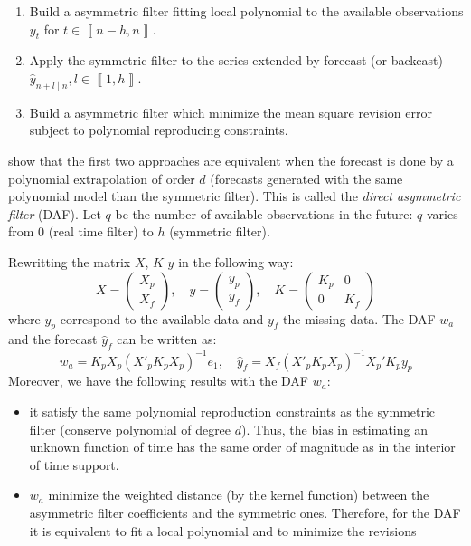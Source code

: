 \documentclass[
  12pt,
  ,
  a4paper]{article}
\newcommand\1{\mathds{1}}
\begin{document}
\begin{enumerate}
\def\labelenumi{\arabic{enumi}.}
\item
  Build a asymmetric filter fitting local polynomial to the available observations \(y_{t}\) for \(t\in\left\llbracket n-h,n\right\rrbracket\).
\item
  Apply the symmetric filter to the series extended by forecast (or backcast) \(\hat{y}_{n+l\mid n},l\in\left\llbracket 1,h\right\rrbracket\).
\item
  Build a asymmetric filter which minimize the mean square revision error subject to polynomial reproducing constraints.
\end{enumerate}

\textcite{proietti2008} show that the first two approaches are equivalent when the forecast is done by a polynomial extrapolation of order \(d\) (forecasts generated with the same polynomial model than the symmetric filter). This is called the \emph{direct asymmetric filter} (DAF).
Let \(q\) be the number of available observations in the future: \(q\) varies from 0 (real time filter) to \(h\) (symmetric filter).

Rewritting the matrix \(X\), \(K\) \(y\) in the following way:
\[
X=\begin{pmatrix}X_{p}\\
X_{f}
\end{pmatrix},\quad y=\begin{pmatrix}y_{p}\\
y_{f}
\end{pmatrix},\quad K=\begin{pmatrix}K_{p} & 0\\
0 & K_{f}
\end{pmatrix}
\]
where \(y_{p}\) correspond to the available data and \(y_{f}\) the missing data. The DAF \(w_a\) and the forecast \(\hat{y}_{f}\) can be written as:
\[
w_{a}=K_{p}X_{p}(X'_{p}K_{p}X_{p})^{-1}e_{1},
\quad
\hat{y}_{f}=X_{f}(X'_{p}K_{p}X_{p})^{-1}X_{p}'K_{p}y_{p}
\]
Moreover, we have the following results with the DAF \(w_a\):

\begin{itemize}
\item
  it satisfy the same polynomial reproduction constraints as the symmetric filter (conserve polynomial of degree \(d\)).
  Thus, the bias in estimating an unknown function of time has the same order of magnitude as in the interior of time support.
\item
  \(w_a\) minimize the weighted distance (by the kernel function) between the asymmetric filter coefficients and the symmetric ones.
  Therefore, for the DAF it is equivalent to fit a local polynomial and to minimize the revisions
\end{itemize}
\end{document}
